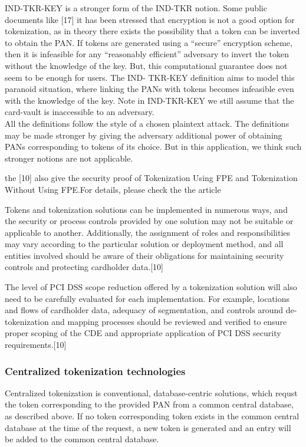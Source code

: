 \documentclass[journal]{IEEEtran}
\begin{document}
IND-TKR-KEY is a stronger form of the IND-TKR notion. Some public documents like [17] it has been stressed that encryption is not a good option for tokenization, as in theory there exists the possibility that a token can be inverted to obtain the PAN. If tokens are generated using a “secure” encryption scheme, then it is infeasible for any “reasonably efficient” adversary to invert the token without the knowledge of the key. But, this computational guarantee does not seem to be enough for users. The IND-
TKR-KEY definition aims to model this paranoid situation, where linking the PANs with tokens becomes infeasible even with the knowledge of the key. Note in IND-TKR-KEY we still assume that the card-vault is inaccessible to an adversary.
\\

All the definitions follow the style of a chosen plaintext attack. The definitions may be made stronger by giving the adversary additional power of obtaining PANs corresponding to tokens of its choice. But in this application, we think such stronger notions are not applicable.

the [10] also give the security proof of Tokenization Using FPE and Tokenization Without Using FPE.For details, please check the the article

Tokens and tokenization solutions can be implemented in numerous ways, and the security or process controls provided by one solution may not be suitable or applicable to another. Additionally, the assignment of roles and responsibilities may vary according to the particular solution or deployment method, and all entities involved should be aware of their obligations for maintaining security controls and protecting cardholder data.[10]

The level of PCI DSS scope reduction offered by a tokenization solution will also need to be carefully evaluated for each implementation. For example, locations and flows of cardholder data, adequacy of segmentation, and controls around de-tokenization and mapping processes should be reviewed and verified to ensure proper scoping of the CDE and appropriate application of PCI DSS security requirements.[10]
\subsubsection{Centralized tokenization technologies}
Centralized tokenization is conventional, database-centric solutions, which requst the token corresponding to the provided PAN from a common central database, as described above. If no token corresponding token exists in the common central database at the time of the request, a new token is generated and an entry will be added to the common central database.
\end{document}
